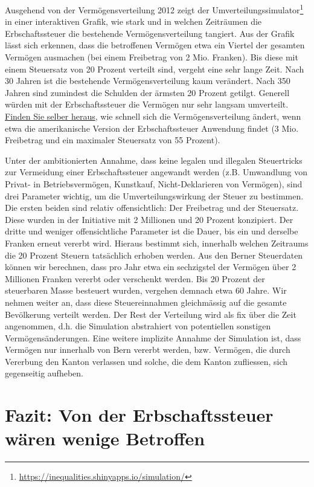 \documentclass[a4paper, 12pt,liststotoc]{scrartcl}
\numberwithin{equation}{section}
\begin{document}
Ausgehend von der Vermögensverteilung 2012 zeigt der Umverteilungssimulator\footnote{\url{https://inequalities.shinyapps.io/simulation/}} 
in einer interaktiven Grafik, wie stark und in welchen Zeiträumen die
Erbschaftssteuer die bestehende Vermögensverteilung tangiert. Aus der
Grafik lässt sich erkennen, dass die betroffenen Vermögen etwa ein
Viertel der gesamten Vermögen ausmachen (bei einem Freibetrag von 2 Mio.
Franken). Bis diese mit einem Steuersatz von 20 Prozent verteilt sind,
vergeht eine sehr lange Zeit. Nach 30 Jahren ist die bestehende
Vermögensverteilung kaum verändert. Nach 350 Jahren sind zumindest die
Schulden der ärmsten 20 Prozent getilgt. Generell würden mit der
Erbschaftssteuer die Vermögen nur sehr langsam umverteilt. \href{https://inequalities.shinyapps.io/simulation/}{Finden Sie
selber heraus}, wie schnell sich die Vermögensverteilung ändert, wenn
etwa die amerikanische Version der Erbschaftssteuer Anwendung findet (3
Mio. Freibetrag und ein maximaler Steuersatz von 55 Prozent).

Unter der ambitionierten Annahme, dass keine legalen und illegalen Steuertricks zur Vermeidung einer Erbschaftssteuer angewandt werden (z.B. Umwandlung von Privat- in Betriebsvermögen, Kunstkauf, Nicht-Deklarieren von Vermögen), sind drei Parameter wichtig, um die Umverteilungswirkung der Steuer zu bestimmen. Die ersten beiden sind relativ offensichtlich: Der Freibetrag und der Steuersatz. Diese wurden in der Initiative mit 2 Millionen und 20 Prozent konzipiert. Der dritte und weniger offensichtliche Parameter ist die Dauer, bis ein und derselbe Franken erneut vererbt wird. Hieraus bestimmt sich, innerhalb welchen Zeitraums die 20 Prozent Steuern tatsächlich erhoben werden. Aus den Berner Steuerdaten können wir berechnen, dass pro Jahr etwa ein sechzigstel der Vermögen über 2 Millionen Franken vererbt oder verschenkt werden. Bis 20 Prozent der steuerbaren Masse besteuert wurden, vergehen demnach etwa 60 Jahre.  Wir nehmen weiter an, dass diese Steuereinnahmen gleichmässig auf die gesamte Bevölkerung verteilt werden. Der Rest der Verteilung wird als fix über die Zeit angenommen, d.h. die Simulation abstrahiert von potentiellen sonstigen Vermögensänderungen. Eine weitere implizite Annahme der Simulation ist, dass Vermögen nur innerhalb von Bern vererbt werden, bzw. Vermögen, die durch Vererbung den Kanton verlassen und solche, die dem Kanton zufliessen, sich gegenseitig aufheben.

\section{Fazit: Von der Erbschaftssteuer wären wenige
Betroffen}\label{fazit-von-der-erbschaftssteuer-wuxe4ren-wenige-betroffen}
\end{document}
